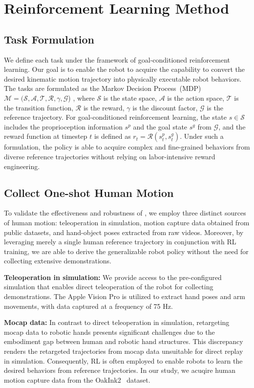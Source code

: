 
\section{Reinforcement Learning Method}
\subsection{Task Formulation}
We define each task under the framework of goal-conditioned reinforcement learning. Our goal is to enable the robot to acquire the capability to convert the desired kinematic motion trajectory into physically executable robot behaviors. The tasks are formulated as the Markov Decision
Process~(MDP) $\mathcal{M}=(\mathcal{S}, \mathcal{A}, \mathcal{T}, \mathcal{R}, \gamma, \mathcal{G}$) , where $\mathcal{S}$ is the state space, $\mathcal{A}$ is the action space, $\mathcal{T}$ is the transition function, $\mathcal{R}$ is the reward, $\gamma$ is the discount factor, $\mathcal{G}$ is the reference trajectory. For goal-conditioned reinforcement learning,  the state $s \in \mathcal{S}$  includes the proprioception information $s^{p}$ and the goal state $s^{g}$ from $\mathcal{G}$, and the reward function at timestep $t$ is defined as $r_{t}=\mathcal{R}(s^{p}_{t}, s^{g}_{t})$. Under such a formulation, the policy is able to acquire complex and fine-grained behaviors from diverse reference trajectories without relying on labor-intensive reward engineering. 


\subsection{Collect One-shot Human Motion}
To validate the effectiveness and robustness of \ourshort, we employ three distinct sources of human motion: teleoperation in simulation, motion capture data obtained from public datasets, and hand-object poses extracted from raw videos. Moreover, by leveraging merely a single human reference trajectory in conjunction with RL training, we are able to derive the generalizable robot policy without the need for collecting extensive demonstrations.

\textbf{Teleoperation in simulation:} We provide access to the pre-configured simulation that enables direct teleoperation of the robot for collecting demonstrations. The Apple Vision Pro is utilized to extract hand poses and arm movements, with data captured at a frequency of 75 Hz.

\textbf{Mocap data:} In contrast to direct teleoperation in simulation, retargeting mocap data to robotic hands presents significant challenges due to the embodiment gap between human and robotic hand structures. This discrepancy renders the retargeted trajectories from mocap data unsuitable for direct replay in simulation. Consequently, RL is often employed to enable robots to learn the desired behaviors from reference trajectories. In our study, we acuqire human motion capture data from the OakInk2~\cite{zhan2024oakink2} dataset. 

